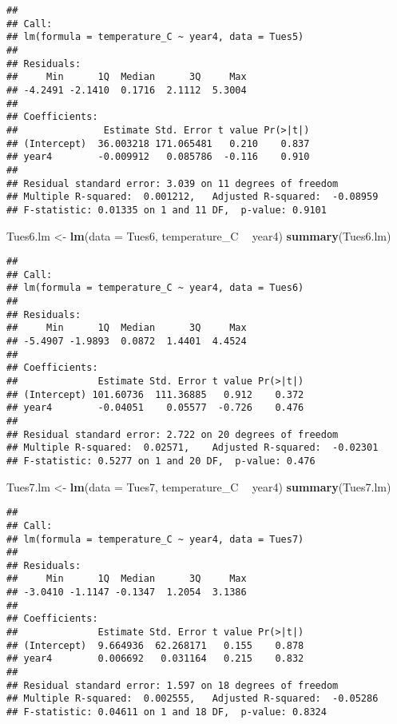 \documentclass[]{article}
\newenvironment{Shaded}{\begin{snugshade}}{\end{snugshade}}
\newcommand{\DataTypeTok}[1]{\textcolor[rgb]{0.13,0.29,0.53}{#1}}
\newcommand{\KeywordTok}[1]{\textcolor[rgb]{0.13,0.29,0.53}{\textbf{#1}}}
\newcommand{\NormalTok}[1]{#1}
\newcommand{\OperatorTok}[1]{\textcolor[rgb]{0.81,0.36,0.00}{\textbf{#1}}}
\newcommand{\StringTok}[1]{\textcolor[rgb]{0.31,0.60,0.02}{#1}}
\begin{document}
\begin{verbatim}
## 
## Call:
## lm(formula = temperature_C ~ year4, data = Tues5)
## 
## Residuals:
##     Min      1Q  Median      3Q     Max 
## -4.2491 -2.1410  0.1716  2.1112  5.3004 
## 
## Coefficients:
##               Estimate Std. Error t value Pr(>|t|)
## (Intercept)  36.003218 171.065481   0.210    0.837
## year4        -0.009912   0.085786  -0.116    0.910
## 
## Residual standard error: 3.039 on 11 degrees of freedom
## Multiple R-squared:  0.001212,   Adjusted R-squared:  -0.08959 
## F-statistic: 0.01335 on 1 and 11 DF,  p-value: 0.9101
\end{verbatim}

\begin{Shaded}
\begin{Highlighting}[]
\NormalTok{Tues6.lm <-}\StringTok{ }\KeywordTok{lm}\NormalTok{(}\DataTypeTok{data =}\NormalTok{ Tues6, temperature_C }\OperatorTok{~}\StringTok{ }\NormalTok{year4)}
\KeywordTok{summary}\NormalTok{(Tues6.lm)}
\end{Highlighting}
\end{Shaded}

\begin{verbatim}
## 
## Call:
## lm(formula = temperature_C ~ year4, data = Tues6)
## 
## Residuals:
##     Min      1Q  Median      3Q     Max 
## -5.4907 -1.9893  0.0872  1.4401  4.4524 
## 
## Coefficients:
##              Estimate Std. Error t value Pr(>|t|)
## (Intercept) 101.60736  111.36885   0.912    0.372
## year4        -0.04051    0.05577  -0.726    0.476
## 
## Residual standard error: 2.722 on 20 degrees of freedom
## Multiple R-squared:  0.02571,    Adjusted R-squared:  -0.02301 
## F-statistic: 0.5277 on 1 and 20 DF,  p-value: 0.476
\end{verbatim}

\begin{Shaded}
\begin{Highlighting}[]
\NormalTok{Tues7.lm <-}\StringTok{ }\KeywordTok{lm}\NormalTok{(}\DataTypeTok{data =}\NormalTok{ Tues7, temperature_C }\OperatorTok{~}\StringTok{ }\NormalTok{year4)}
\KeywordTok{summary}\NormalTok{(Tues7.lm)}
\end{Highlighting}
\end{Shaded}

\begin{verbatim}
## 
## Call:
## lm(formula = temperature_C ~ year4, data = Tues7)
## 
## Residuals:
##     Min      1Q  Median      3Q     Max 
## -3.0410 -1.1147 -0.1347  1.2054  3.1386 
## 
## Coefficients:
##              Estimate Std. Error t value Pr(>|t|)
## (Intercept)  9.664936  62.268171   0.155    0.878
## year4        0.006692   0.031164   0.215    0.832
## 
## Residual standard error: 1.597 on 18 degrees of freedom
## Multiple R-squared:  0.002555,   Adjusted R-squared:  -0.05286 
## F-statistic: 0.04611 on 1 and 18 DF,  p-value: 0.8324
\end{verbatim}
\end{document}
